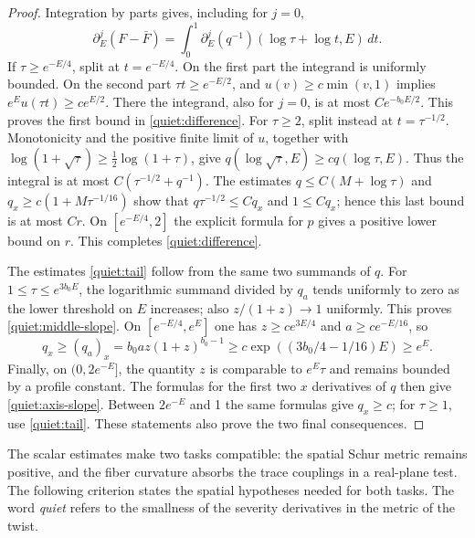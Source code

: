 \begin{proof}
Integration by parts gives, including for \(j=0\),
\begin{equation}\label{quiet:averageidentity}
 \partial_E^j(F-\bar F)
   =\int_0^1\partial_E^j(q^{-1})(\log\tau+\log t,E)\,dt.
\end{equation}
If \(\tau\ge e^{-E/4}\), split at \(t=e^{-E/4}\).  On the first
part the integrand is uniformly bounded.  On the second part
\(\tau t\ge e^{-E/2}\), and
\(u(v)\ge c\min(v,1)\) implies \(e^E u(\tau t)\ge c e^{E/2}\).
There the integrand, also for \(j=0\), is at most \(C e^{-b_0E/2}\).
This proves the first bound in \eqref{quiet:difference}.
For \(\tau\ge2\), split instead at \(t=\tau^{-1/2}\).
Monotonicity and the positive finite limit of \(u\), together with
\(\log(1+\sqrt\tau)\ge\tfrac12\log(1+\tau)\), give
\(q(\log\sqrt\tau,E)\ge c q(\log\tau,E)\).  Thus the integral is
at most \(C(\tau^{-1/2}+q^{-1})\).
The estimates
\(q\le C(M+\log\tau)\) and
\(q_x\ge c(1+M\tau^{-1/16})\) show that
\(q\tau^{-1/2}\le Cq_x\) and \(1\le Cq_x\); hence this last bound is
at most \(Cr\).  On \([e^{-E/4},2]\) the explicit formula for \(p\) gives a
positive lower bound on \(r\).  This completes \eqref{quiet:difference}.

The estimates \eqref{quiet:tail} follow from the same two summands of \(q\).
For \(1\le\tau\le e^{3b_0E}\), the logarithmic summand divided by
\(q_a\) tends uniformly to zero as the lower threshold on \(E\) increases;
also \(z/(1+z)\to1\) uniformly.  This proves
\eqref{quiet:middle-slope}.  On
\([e^{-E/4},e^E]\) one has
\(z\ge c e^{3E/4}\) and \(a\ge c e^{-E/16}\), so
\[
 q_x\ge(q_a)_x=b_0az(1+z)^{b_0-1}
     \ge c\exp((3b_0/4-1/16)E)\ge e^E.
\]
Finally, on \((0,2e^{-E}]\), the quantity \(z\) is comparable to
\(e^E\tau\) and remains bounded by a profile constant.  The formulas
for the first two \(x\) derivatives of \(q\) then give
\eqref{quiet:axis-slope}.  Between \(2e^{-E}\) and 1 the same formulas
give \(q_x\ge c\); for \(\tau\ge1\), use \eqref{quiet:tail}.
These statements also prove the two final consequences.
\end{proof}

The scalar estimates make two tasks compatible: the spatial Schur
metric remains positive, and the fiber curvature absorbs the trace
couplings in a real-plane test. The following criterion states the
spatial hypotheses needed for both tasks. The word \emph{quiet} refers
to the smallness of the severity derivatives in the metric of the twist.

